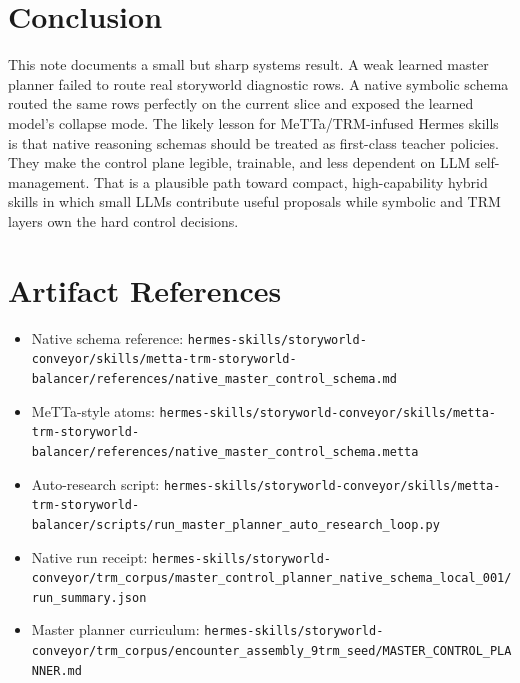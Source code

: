 \documentclass[11pt]{article}
\begin{document}
\section{Conclusion}

This note documents a small but sharp systems result. A weak learned master planner failed to route real storyworld diagnostic rows. A native symbolic schema routed the same rows perfectly on the current slice and exposed the learned model's collapse mode. The likely lesson for MeTTa/TRM-infused Hermes skills is that native reasoning schemas should be treated as first-class teacher policies. They make the control plane legible, trainable, and less dependent on LLM self-management. That is a plausible path toward compact, high-capability hybrid skills in which small LLMs contribute useful proposals while symbolic and TRM layers own the hard control decisions.

\section*{Artifact References}

\begin{itemize}
  \item Native schema reference: \texttt{hermes-skills/storyworld-conveyor/skills/metta-trm-storyworld-balancer/references/native\_master\_control\_schema.md}
  \item MeTTa-style atoms: \texttt{hermes-skills/storyworld-conveyor/skills/metta-trm-storyworld-balancer/references/native\_master\_control\_schema.metta}
  \item Auto-research script: \texttt{hermes-skills/storyworld-conveyor/skills/metta-trm-storyworld-balancer/scripts/run\_master\_planner\_auto\_research\_loop.py}
  \item Native run receipt: \texttt{hermes-skills/storyworld-conveyor/trm\_corpus/master\_control\_planner\_native\_schema\_local\_001/run\_summary.json}
  \item Master planner curriculum: \texttt{hermes-skills/storyworld-conveyor/trm\_corpus/encounter\_assembly\_9trm\_seed/MASTER\_CONTROL\_PLANNER.md}
\end{itemize}
\end{document}
